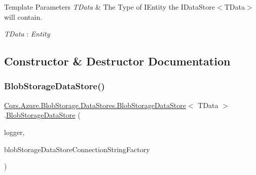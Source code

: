\begin{DoxyTemplParams}{Template Parameters}
{\em T\+Data} & The Type of I\+Entity the I\+Data\+Store$<$\+T\+Data$>$ will contain.\\
\hline
\end{DoxyTemplParams}
\begin{Desc}
\item[Type Constraints]\begin{description}
\item[{\em T\+Data} : {\em Entity}]\end{description}
\end{Desc}


\subsection{Constructor \& Destructor Documentation}
\mbox{\label{classCqrs_1_1Azure_1_1BlobStorage_1_1DataStores_1_1BlobStorageDataStore_aacea885f6a1d38921b99feb898fc33c2_aacea885f6a1d38921b99feb898fc33c2}} 
\subsubsection{\texorpdfstring{Blob\+Storage\+Data\+Store()}{BlobStorageDataStore()}}
{\footnotesize\ttfamily \hyperlink{classCqrs_1_1Azure_1_1BlobStorage_1_1DataStores_1_1BlobStorageDataStore}{Cqrs.\+Azure.\+Blob\+Storage.\+Data\+Stores.\+Blob\+Storage\+Data\+Store}$<$ T\+Data $>$.\hyperlink{classCqrs_1_1Azure_1_1BlobStorage_1_1DataStores_1_1BlobStorageDataStore}{Blob\+Storage\+Data\+Store} (\begin{DoxyParamCaption}\item[{I\+Logger}]{logger,  }\item[{\hyperlink{interfaceCqrs_1_1Azure_1_1BlobStorage_1_1DataStores_1_1IBlobStorageDataStoreConnectionStringFactory}{I\+Blob\+Storage\+Data\+Store\+Connection\+String\+Factory}}]{blob\+Storage\+Data\+Store\+Connection\+String\+Factory }\end{DoxyParamCaption})}



